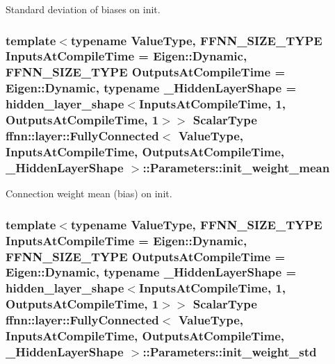 Standard deviation of biases on init. 

\hypertarget{structffnn_1_1layer_1_1_fully_connected_1_1_parameters_a414ae4bbd3a061eb3b1a63bc77986f95}{
\subsubsection[{init\-\_\-weight\-\_\-mean}]{\setlength{\rightskip}{0pt plus 5cm}template$<$typename Value\-Type, F\-F\-N\-N\-\_\-\-S\-I\-Z\-E\-\_\-\-T\-Y\-P\-E Inputs\-At\-Compile\-Time = Eigen\-::\-Dynamic, F\-F\-N\-N\-\_\-\-S\-I\-Z\-E\-\_\-\-T\-Y\-P\-E Outputs\-At\-Compile\-Time = Eigen\-::\-Dynamic, typename \-\_\-\-Hidden\-Layer\-Shape = hidden\-\_\-layer\-\_\-shape$<$\-Inputs\-At\-Compile\-Time, 1, Outputs\-At\-Compile\-Time, 1$>$$>$ {\bf Scalar\-Type} {\bf ffnn\-::layer\-::\-Fully\-Connected}$<$ Value\-Type, Inputs\-At\-Compile\-Time, Outputs\-At\-Compile\-Time, \-\_\-\-Hidden\-Layer\-Shape $>$\-::Parameters\-::init\-\_\-weight\-\_\-mean}}\label{structffnn_1_1layer_1_1_fully_connected_1_1_parameters_a414ae4bbd3a061eb3b1a63bc77986f95}


Connection weight mean (bias) on init. 

\hypertarget{structffnn_1_1layer_1_1_fully_connected_1_1_parameters_a9f74c8450bd5a7c86a3d03bd3512b6a5}{
\subsubsection[{init\-\_\-weight\-\_\-std}]{\setlength{\rightskip}{0pt plus 5cm}template$<$typename Value\-Type, F\-F\-N\-N\-\_\-\-S\-I\-Z\-E\-\_\-\-T\-Y\-P\-E Inputs\-At\-Compile\-Time = Eigen\-::\-Dynamic, F\-F\-N\-N\-\_\-\-S\-I\-Z\-E\-\_\-\-T\-Y\-P\-E Outputs\-At\-Compile\-Time = Eigen\-::\-Dynamic, typename \-\_\-\-Hidden\-Layer\-Shape = hidden\-\_\-layer\-\_\-shape$<$\-Inputs\-At\-Compile\-Time, 1, Outputs\-At\-Compile\-Time, 1$>$$>$ {\bf Scalar\-Type} {\bf ffnn\-::layer\-::\-Fully\-Connected}$<$ Value\-Type, Inputs\-At\-Compile\-Time, Outputs\-At\-Compile\-Time, \-\_\-\-Hidden\-Layer\-Shape $>$\-::Parameters\-::init\-\_\-weight\-\_\-std}}\label{structffnn_1_1layer_1_1_fully_connected_1_1_parameters_a9f74c8450bd5a7c86a3d03bd3512b6a5}


